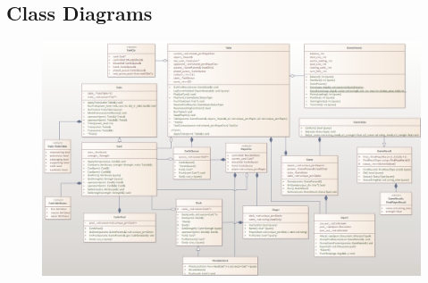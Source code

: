 \begin{landscape}
\section{Class Diagrams}
\begin{figure}[H]
    \centering
    \includegraphics[width=\textwidth -1cm]{CD1.png}
\end{figure}
\end{landscape}
\setcounter{page}{9}

